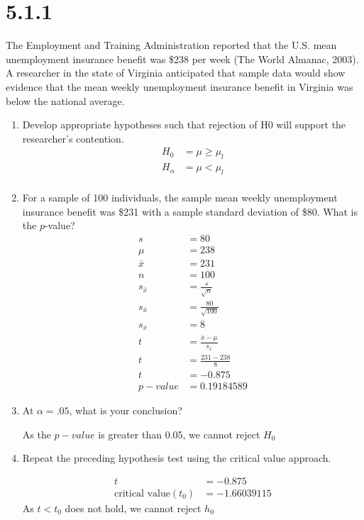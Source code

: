 \documentclass{article}
\begin{document}
\section*{5.1.1}
The Employment and Training Administration reported that the U.S. mean unemployment insurance benefit was \$238 per week (The World Almanac, 2003). A researcher in the state of Virginia anticipated that sample data would show evidence that the mean weekly unemployment insurance benefit in Virginia was below the national average.

\begin{enumerate}
  \item Develop appropriate hypotheses such that rejection of H0 will support the researcher’s contention.
  \begin{align*}
    H_{0} &= \mu \geq \mu_{l}\\
    H_{\alpha} &= \mu < \mu_{l}\\
  \end{align*}

  \item For a sample of 100 individuals, the sample mean weekly unemployment insurance benefit was \$231 with a sample standard deviation of \$80. What is the $p$-value?
  \begin{align*}
    s &= 80\\
    \mu &= 238\\
    \bar{x} &= 231\\
    n &= 100\\
    s_{\bar{x}} &= \frac{s}{\sqrt{n}}\\
    s_{\bar{x}} &= \frac{80}{\sqrt{100}}\\
    s_{\bar{x}} &= 8\\
    t &= \frac{\bar{x} - \mu}{s_{\bar{x}}}\\
    t &= \frac{231 - 238}{8}\\
    t &= -0.875\\
    p-value &= 0.19184589
  \end{align*}

  \item At $\alpha = .05$, what is your conclusion?

  As the $p-value$ is greater than 0.05, we cannot reject $H_{0}$

  \item Repeat the preceding hypothesis test using the critical value approach.

  \begin{align*}
    t &= -0.875\\
    \text{critical value} (t_{0}) &= -1.66039115
  \end{align*}
  As $t < t_{0}$ does not hold, we cannot reject $h_{0}$

\end{enumerate}
\pagebreak
\end{document}
